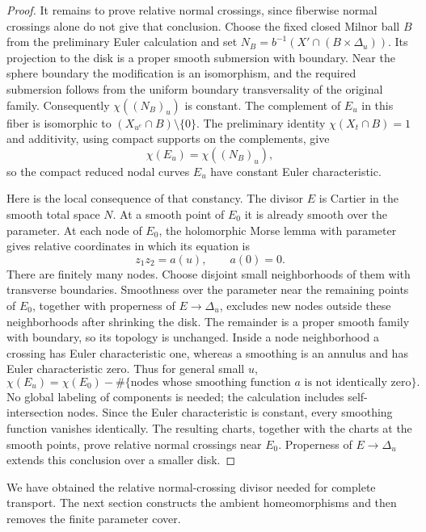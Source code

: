\begin{proof}
It remains to prove relative normal crossings, since fiberwise normal
crossings alone do not give that conclusion.  Choose the fixed closed
Milnor ball $B$ from the preliminary Euler calculation and set
$N_B=b^{-1}(X'\cap(B\times\Delta_u))$.  Its projection to the disk
is a proper smooth submersion with boundary.  Near the sphere boundary
the modification is an isomorphism, and the required submersion follows
from the uniform boundary transversality of the original family.
Consequently $\chi((N_B)_u)$ is constant.  The complement of $E_u$ in
this fiber is isomorphic to $(X_{u^e}\cap B)\setminus\{0\}$.  The
preliminary identity $\chi(X_t\cap B)=1$ and additivity, using compact
supports on the complements, give
\[
 \chi(E_u)=\chi((N_B)_u),
\]
so the compact reduced nodal curves $E_u$ have constant Euler
characteristic.

Here is the local consequence of that constancy.  The divisor $E$ is
Cartier in the smooth total space $N$.  At a smooth point of $E_0$ it
is already smooth over the parameter.  At each node of $E_0$, the
holomorphic Morse lemma with parameter gives relative coordinates in
which its equation is
\[
 z_1z_2=a(u),\qquad a(0)=0.
\]
There are finitely many nodes.  Choose disjoint small neighborhoods of
them with transverse boundaries.  Smoothness over the parameter near
the remaining points of $E_0$, together with properness of $E\to\Delta_u$,
excludes new nodes outside these neighborhoods after shrinking the disk.
The remainder is a proper smooth family with boundary, so its topology
is unchanged.  Inside a node neighborhood a crossing has Euler
characteristic one, whereas a smoothing is an annulus and has Euler
characteristic zero.  Thus for general small $u$,
\[
 \chi(E_u)=\chi(E_0)-
 \#\{\text{nodes whose smoothing function }a\text{ is not identically zero}\}.
\]
No global labeling of components is needed; the calculation includes
self-intersection nodes.  Since the Euler characteristic is constant,
every smoothing function vanishes identically.  The resulting charts,
together with the charts at the smooth points, prove relative normal
crossings near $E_0$.  Properness of $E\to\Delta_u$ extends this
conclusion over a smaller disk.
\end{proof}

We have obtained the relative normal-crossing divisor needed for complete
transport.  The next section constructs the ambient homeomorphisms and
then removes the finite parameter cover.
